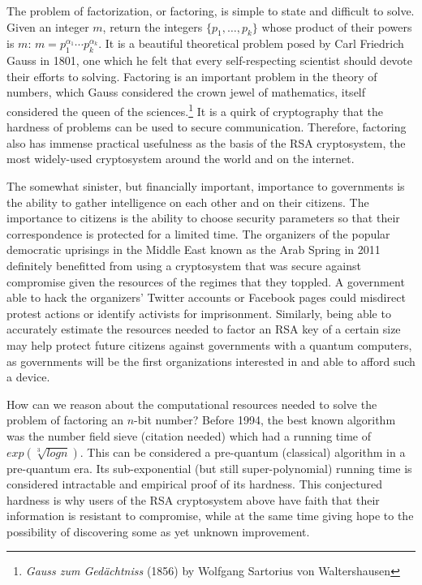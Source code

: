 The problem of factorization, or factoring,
is simple to state and difficult to solve.
Given an integer $m$, return the integers $\{p_1, \ldots, p_k\}$ whose
product of their powers is $m$: $m = p_1^{\alpha_1}\cdots p_k^{\alpha_k}$.
It is a beautiful theoretical problem posed by Carl Friedrich Gauss in 1801,
one which he felt that every self-respecting scientist should devote their
efforts to solving. Factoring is an important problem in the theory of
numbers, which Gauss considered the crown jewel of mathematics, itself
considered the queen of the sciences.\footnote{\emph{Gauss zum Ged\"achtniss} (1856) by Wolfgang Sartorius von Waltershausen}
It is a quirk of cryptography that the hardness of problems can be used
to secure communication. Therefore, factoring also has immense practical
usefulness as the basis of the RSA cryptosystem, the most widely-used
cryptosystem around the world and on the internet.

The somewhat sinister,
but financially important, importance to
governments is the ability to gather intelligence on each other and on their
citizens. The importance to citizens is the ability to choose security
parameters so that their correspondence is protected for a limited time.
The organizers of the popular democratic uprisings in the Middle East known
as the Arab Spring in 2011 definitely benefitted from using a cryptosystem that was
secure against compromise given the resources of the regimes that they toppled.
A government able to hack the organizers' Twitter accounts or Facebook pages
could misdirect protest actions or identify activists for imprisonment.
Similarly, being able to accurately estimate the resources needed to factor
an RSA key of a certain size may help protect future citizens against
governments with a quantum computers, as governments will be the first
organizations interested in and able to afford such a device.

How can we reason about the computational resources needed to solve the
problem of factoring an $n$-bit number?
Before 1994, the best known algorithm was the
number field sieve (citation needed) which had a running time of
$exp(\sqrt[3]{log n})$. This can be considered a pre-quantum (classical)
algorithm in a pre-quantum era. Its sub-exponential (but still super-polynomial)
running time is considered intractable and empirical proof of its hardness.
This conjectured hardness is why users of the RSA cryptosystem above have faith
that their information is resistant to compromise, while at the same time
giving hope to the possibility of discovering some as yet unknown improvement.

